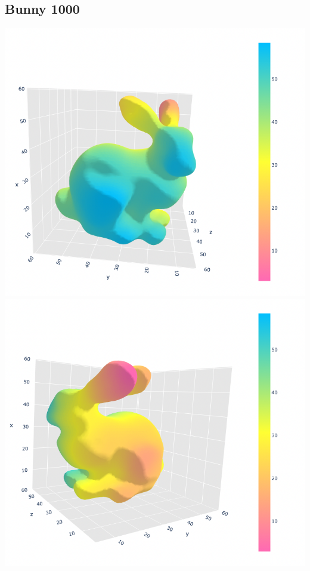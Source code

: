 \documentclass{article}
\begin{document}
\subsection*{Bunny 1000}
\includegraphics[scale=0.4]{images/1000mls}
\newline 
\includegraphics[scale=0.4]{images/1000mls2}
\end{document}
